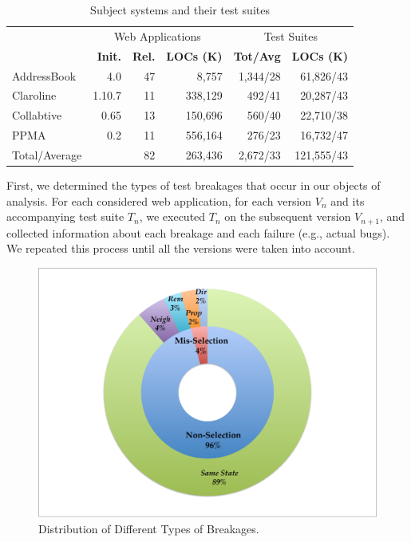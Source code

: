 \begin{table}[t]
\setlength{\tabcolsep}{2pt}
\renewcommand{\arraystretch}{0.9}
\centering
\caption{Subject systems and their test suites}
\begin{tabular}{lrrr@{\hskip 2em}r@{\hskip 1em}r}
\toprule

& \multicolumn{3}{c}{\sc Web Applications} 
& \multicolumn{2}{c}{\sc Test Suites} \\

\cmidrule(r){2-4} \cmidrule(r){5-6}

& {\textbf{Init.}} 
& {\textbf{Rel.}}
& {\textbf{LOCs (K)}} 
& {\textbf{Tot/Avg}} 
& {\textbf{LOCs (K)}}   \\

\midrule
AddressBook   & 4.0       & 47       & 8,757   & 1,344/28        & 61,826/43          \\
Claroline     & 1.10.7    & 11       & 338,129 & 492/41        & 20,287/43          \\
Collabtive    & 0.65      & 13       & 150,696 & 560/40        & 22,710/38          \\
PPMA          & 0.2       & 11       & 556,164 & 276/23        & 16,732/47          \\
\midrule
Total/Average &           & 82       & 263,436 & 2,672/33        & 121,555/43 \\

\bottomrule
\end{tabular}
\label{table:subjectSystems}
\end{table}

\label{sec:procedure}
First, we determined the types of test breakages that occur in our objects of analysis. For each considered web application, for each version $V_n$ and its accompanying test suite $T_n$, we executed $T_n$ on the subsequent version $V_{n+1}$, and collected information about each breakage and each failure (e.g., actual bugs). We repeated this process until all the versions were taken into account. 

\begin{figure}[b]
\centering
\includegraphics[trim={0cm 0cm 0cm 0cm},clip,scale=0.23]{images/donut}
\caption{Distribution of Different Types of Breakages.}
\label{donut}
\end{figure}

